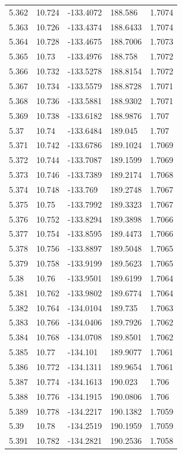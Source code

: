 \begin{tabular}{lllll}
5.362 & 10.724 & -133.4072 & 188.586 & 1.7074 \\
5.363 & 10.726 & -133.4374 & 188.6433 & 1.7074 \\
5.364 & 10.728 & -133.4675 & 188.7006 & 1.7073 \\
5.365 & 10.73 & -133.4976 & 188.758 & 1.7072 \\
5.366 & 10.732 & -133.5278 & 188.8154 & 1.7072 \\
5.367 & 10.734 & -133.5579 & 188.8728 & 1.7071 \\
5.368 & 10.736 & -133.5881 & 188.9302 & 1.7071 \\
5.369 & 10.738 & -133.6182 & 188.9876 & 1.707 \\
5.37 & 10.74 & -133.6484 & 189.045 & 1.707 \\
5.371 & 10.742 & -133.6786 & 189.1024 & 1.7069 \\
5.372 & 10.744 & -133.7087 & 189.1599 & 1.7069 \\
5.373 & 10.746 & -133.7389 & 189.2174 & 1.7068 \\
5.374 & 10.748 & -133.769 & 189.2748 & 1.7067 \\
5.375 & 10.75 & -133.7992 & 189.3323 & 1.7067 \\
5.376 & 10.752 & -133.8294 & 189.3898 & 1.7066 \\
5.377 & 10.754 & -133.8595 & 189.4473 & 1.7066 \\
5.378 & 10.756 & -133.8897 & 189.5048 & 1.7065 \\
5.379 & 10.758 & -133.9199 & 189.5623 & 1.7065 \\
5.38 & 10.76 & -133.9501 & 189.6199 & 1.7064 \\
5.381 & 10.762 & -133.9802 & 189.6774 & 1.7064 \\
5.382 & 10.764 & -134.0104 & 189.735 & 1.7063 \\
5.383 & 10.766 & -134.0406 & 189.7926 & 1.7062 \\
5.384 & 10.768 & -134.0708 & 189.8501 & 1.7062 \\
5.385 & 10.77 & -134.101 & 189.9077 & 1.7061 \\
5.386 & 10.772 & -134.1311 & 189.9654 & 1.7061 \\
5.387 & 10.774 & -134.1613 & 190.023 & 1.706 \\
5.388 & 10.776 & -134.1915 & 190.0806 & 1.706 \\
5.389 & 10.778 & -134.2217 & 190.1382 & 1.7059 \\
5.39 & 10.78 & -134.2519 & 190.1959 & 1.7059 \\
5.391 & 10.782 & -134.2821 & 190.2536 & 1.7058 \\

\end{tabular}

